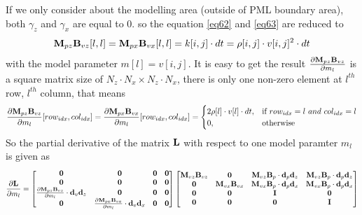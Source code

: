 \documentclass[revised,endfloat]{geophysics}
\begin{document}
If we only consider about the modelling area (outside of PML boundary area), both $\gamma_z$ and $\gamma_x$ are equal to $0$. so the equation \ref{eq62} and \ref{eq63} are reduced to 
\begin{equation}
{\bf M}_{pz}{\bf B}_{vz}[l,l]= {\bf M}_{px}{\bf B}_{vx}[l,l] = k[i,j] \cdot dt = \rho[i,j] \cdot v[i,j]^2 \cdot dt
\label{eq65}
\end{equation}
with the model parameter $m[l] = v[i,j]$. It is easy to get the result $\frac{\partial {\bf M}_{pz}{\bf B}_{vz}} {\partial m_l}$ is a square matrix size of $N_z \cdot N_x \times N_z \cdot N_x$, there is only one non-zero element at $l^{th}$ row, $l^{th}$ column, that means
\begin{equation}
\frac{\partial {\bf M}_{pz}{\bf B}_{vz}} {\partial m_l}[row_{idx}, col_{idx}] = \frac{\partial {\bf M}_{px}{\bf B}_{vx}} {\partial m_l}[row_{idx}, col_{idx}] = \begin{cases}
    2 \rho[l] \cdot v[l] \cdot dt,& \text{if\,\,} row_{idx} = l \,\,and \,\, col_{idx} =l \\
    0,              & \text{otherwise}
\end{cases}
\label{eq66}
\end{equation}
So the partial derivative of the matrix ${\bf L}$ with respect to one model paramter $m_l$ is given as 
\begin{equation}
\frac{\partial {\bf L}}{\partial m_l} =  
\begin{bmatrix}
\bf{0}   & \bf{0}   & \bf{0} & \bf{0}   \\
\bf{0}   & \bf{0}   & \bf{0} & \bf{0}   \\
\frac{{\partial \bf M}_{pz}{\bf B}_{vz}}{\partial m_l} \cdot {\bf d}_v{\bf d}_z & \bf{0} & {\bf 0} & \bf{0}   \\ 
\bf{0} & \frac{{\partial \bf M}_{px}{\bf B}_{vx}}{\partial m_l} \cdot {\bf d}_v{\bf d}_x & \bf{0} & {\bf 0} \\ 
\end{bmatrix}
\begin{bmatrix}
{\bf M}_{vz}{\bf B}_{vz} & \bf{0} & {\bf M}_{vz}{\bf B}_{p} \cdot {\bf d}_p{\bf d}_z & {\bf M}_{vz}{\bf B}_{p} \cdot {\bf d}_p{\bf d}_z  \\
\bf{0} & {\bf M}_{vx}{\bf B}_{vx} & {\bf M}_{vx}{\bf B}_{p} \cdot {\bf d}_p{\bf d}_x & {\bf M}_{vx}{\bf B}_{p} \cdot {\bf d}_p{\bf d}_x \\
\bf{0}   & \bf{0}   & \bf{I}   & \bf{0}   \\
\bf{0}   & \bf{0}   & \bf{0}  & \bf{I}   
\end{bmatrix}
\label{eq67}
\end{equation}
\end{document}
